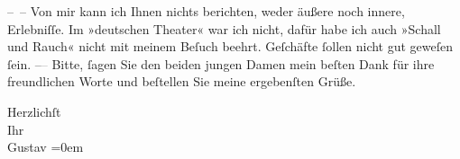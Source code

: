 \pstart
           – – Von mir kann ich Ihnen nichts berichten, weder äußere noch innere,
               Erlebniſſe. Im »deutschen Theater« war ich nicht,
               dafür habe ich auch »Schall und Rauch« nicht mit
               meinem Beſuch beehrt. Geſchäfte{ }ſollen nicht gut geweſen{ }ſein. –\textcolor{gray}{–}
               Bitte,{ }ſagen Sie den beiden jungen Damen mein beſten Dank für ihre freundlichen Worte und beſtellen Sie meine
               ergebenſten Grüße.\pend
           
\pstart
           Herzlichſt{\\[\baselineskip]}Ihr{\\[\baselineskip]}\spacefill\mbox{Gustav}\pend
           \leftskip=0em{}\endnumbering{}
\begin{anhang}
\end{anhang}\newcommand{\dateiname}{L04308}\newcommand{\titel}{Gustav Schwarzkopf an Arthur Schnitzler, 6. 7. 1901}\newcommand{\editorInnen}{Herausgegeben von Jahnke, SelmaMüller, Martin Anton}
